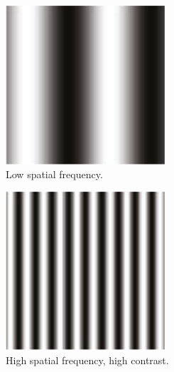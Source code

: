 \begin{figure}[!htp]
    \centering
    \begin{subfigure}[t]{0.3\textwidth}
        \centering
        \includegraphics[width=0.65\textwidth]{assets/images/grating-stimuli/1.png}
        \caption{{Low spatial frequency.}}
    \end{subfigure}
    \hspace{0.03\textwidth}
    \begin{subfigure}[t]{0.3\textwidth}
        \centering
        \includegraphics[width=0.65\textwidth]{assets/images/grating-stimuli/2.png}
        \caption{High spatial frequency, high contrast.}
    \end{subfigure}
    \hspace{0.03\textwidth}
    \begin{subfigure}[t]{0.3\textwidth}
        \centering

\end{subfigure}
\end{figure}
